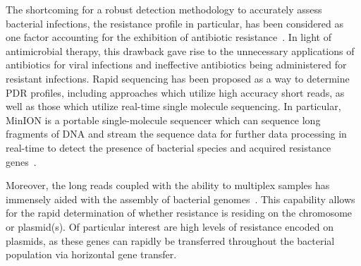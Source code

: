 The shortcoming for a robust detection methodology to accurately assess bacterial infections, the resistance profile in particular, has been considered as one factor accounting for the exhibition of antibiotic resistance~\cite{sommer2017M10}.
In light of antimicrobial therapy, this drawback gave rise to the unnecessary applications of antibiotics for viral infections and ineffective antibiotics being administered for resistant infections. 
Rapid sequencing has been proposed as a way to determine PDR profiles, including approaches which utilize high accuracy short reads, as well as those which utilize real-time single molecule sequencing. 
In particular, MinION is a portable single-molecule sequencer which can sequence long fragments of DNA and stream the sequence data for further data processing in real-time to detect the presence of bacterial species and acquired resistance genes~\cite{Gardy2018M11, Lemon2017M15,Votintseva2017M16,CaoGE2016,QuickAC2015}. 

Moreover, the long reads coupled with the ability to multiplex samples has immensely aided with the assembly of bacterial genomes~\cite{Nguyen2017barcode,Wick2017M12,Li2018M13,George2017M14}. 
This capability allows for the rapid determination of whether resistance is residing on the chromosome or plasmid(s). 
Of particular interest are high levels of resistance encoded on plasmids, as these genes can rapidly be transferred throughout the bacterial population via horizontal gene transfer.

